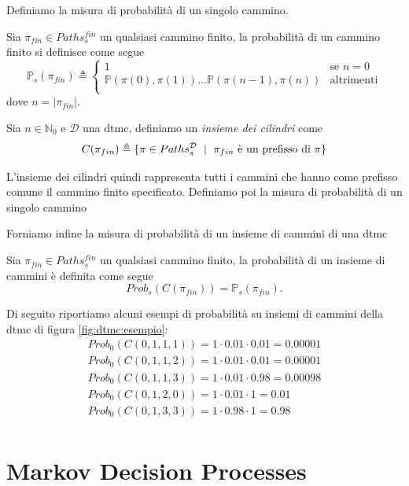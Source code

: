 Definiamo la misura di probabilità di un singolo cammino.
\begin{mtdef}
Sia $\pi_{fin} \in Paths^{fin}_s$ un qualsiasi cammino finito, la probabilità di un  cammino finito si definisce come segue
$$
	\mathbb{P}_s(\pi_{fin}) \triangleq \left\{
	\begin{array}{ll}
		1 & \mbox{se } n=0 \\
		\mathbb{P}(\pi(0),\pi(1))\dots\mathbb{P}(\pi(n-1),\pi(n)) & \mbox{altrimenti} \\
	\end{array}
	\right.
$$
dove $n = |\pi_{fin}|$.
\end{mtdef}

\begin{mtdef}
	Sia $n \in \mathbb{N}_0$ e $\mathcal{D}$ una \ac{dtmc}, definiamo un \emph{insieme dei cilindri} come
$$ 
C(\pi_{fin}) \triangleq \{\pi \in Paths^\mathcal{D}_s \mbox{ }\mid\mbox{ } \pi_{fin} \mbox{ è un prefisso di } \pi \} 
$$
\end{mtdef}
L'insieme dei cilindri quindi rappresenta tutti i cammini che hanno come prefisso comune il cammino finito specificato. Definiamo poi la misura di probabilità di un singolo cammino

Forniamo infine la misura di probabilità di un insieme di cammini di una \ac{dtmc}
\begin{mtdef}
	Sia $\pi_{fin} \in Paths^{fin}_s$ un qualsiasi cammino finito, la probabilità di un insieme di cammini è definita come segue
$$ Prob_s(C(\pi_{fin})) = \mathbb{P}_s(\pi_{fin}). $$
\end{mtdef}

Di seguito riportiamo alcuni esempi di probabilità su insiemi di cammini della \ac{dtmc} di figura \ref{fig:dtmc:esempio}:
$$
\begin{array}{l}
	Prob_0(C(0,1,1,1)) = 1 \cdot 0.01 \cdot 0.01 = 0.00001 \\
	Prob_0(C(0,1,1,2)) = 1 \cdot 0.01 \cdot 0.01 = 0.00001 \\
	Prob_0(C(0,1,1,3)) = 1 \cdot 0.01 \cdot 0.98 = 0.00098 \\
	Prob_0(C(0,1,2,0)) = 1 \cdot 0.01 \cdot 1 = 0.01 \\
	Prob_0(C(0,1,3,3)) = 1 \cdot 0.98 \cdot 1 = 0.98 \\
\end{array}
$$

\section{Markov Decision Processes}

